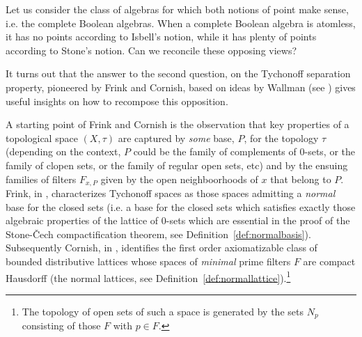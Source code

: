 \documentclass{article}
\theoremstyle{plain}
\theoremstyle{definition}
\theoremstyle{remark}
\newcommand{\0}{\mathbbm 0}
\newcommand{\1}{\mathbbm 1}
\newcommand{\2}{\mathbbm 2}
\begin{document}
Let us consider the class of algebras for which both notions of point make sense, i.e. the complete Boolean algebras. When a complete Boolean algebra is atomless, it has no points according to Isbell's notion, while it has plenty of points according to Stone's notion. Can we reconcile these opposing views?

It turns out that the answer to the second question, on the Tychonoff separation property, pioneered by Frink and Cornish, based on ideas by Wallman (see \cite{Cornish1972NormalL,frink,WallmanComp37}) gives useful insights on how to recompose this opposition.

A starting point of Frink and Cornish is the observation that key properties of a topological space $(X,\tau)$ are captured by \emph{some} base, $P$, for the topology $\tau$ (depending on the context, $P$ could be the family of complements of $0$-sets, or the family of clopen sets, or the family of regular open sets, etc) and by the ensuing families of filters $F_{x,P}$ given by the open neighboorhoods of $x$ that belong to $P$. Frink, in \cite{frink}, characterizes Tychonoff spaces as those spaces admitting a \emph{normal} base for the closed sets (i.e. a base for the closed sets which satisfies exactly those algebraic properties of the lattice of $0$-sets which are essential in the proof of the Stone-\v{C}ech compactification theorem, see Definition~\ref{def:normalbasis}). Subsequently Cornish, in \cite{Cornish1972NormalL}, identifies the first order axiomatizable class of bounded distributive lattices whose spaces of \emph{minimal} prime filters $F$ are compact Hausdorff (the normal lattices, see Definition~\ref{def:normallattice}).\footnote{The topology of open sets of such a space is generated by the sets $N_p$ consisting of those $F$ with $p\in F$.} 

\end{document}
